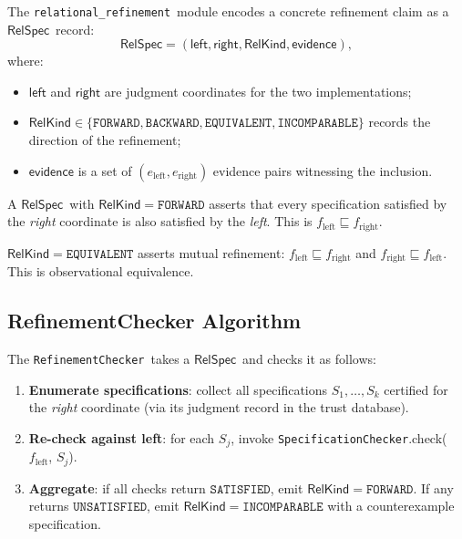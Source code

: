 \documentclass[11pt]{article}
\newcommand{\Refine}{\sqsubseteq}                   %
\newcommand{\RelSpec}{\ensuremath{\mathsf{RelSpec}}} %
\newcommand{\RelKind}{\ensuremath{\mathsf{RelKind}}} %
\newcommand{\SAT}{\texttt{SATISFIED}}               %
\newcommand{\UNSAT}{\texttt{UNSATISFIED}}           %
\newcommand{\relpkg}{\texttt{relational\_refinement}}
\newcommand{\SpecificationChecker}{\texttt{SpecificationChecker}}
\newcommand{\RefinementChecker}{\texttt{RefinementChecker}}
\begin{document}
The \relpkg\ module encodes a concrete refinement claim as a
\RelSpec\ record:
\[
  \RelSpec = (\mathsf{left}, \mathsf{right}, \RelKind, \mathsf{evidence}),
\]
where:
\begin{itemize}[leftmargin=2em]
  \item $\mathsf{left}$ and $\mathsf{right}$ are judgment coordinates
        for the two implementations;
  \item $\RelKind \in \{\texttt{FORWARD}, \texttt{BACKWARD},
        \texttt{EQUIVALENT}, \texttt{INCOMPARABLE}\}$ records the
        direction of the refinement;
  \item $\mathsf{evidence}$ is a set of $(e_{\mathrm{left}},
        e_{\mathrm{right}})$ evidence pairs witnessing the inclusion.
\end{itemize}

\begin{definition}\label{def:forward-refine}
A \RelSpec\ with $\RelKind = \texttt{FORWARD}$ asserts that every
specification satisfied by the \emph{right} coordinate is also
satisfied by the \emph{left}.  This is $f_{\mathrm{left}} \Refine
f_{\mathrm{right}}$.
\end{definition}

\begin{definition}[EQUIVALENT]\label{def:equiv-refine}
$\RelKind = \texttt{EQUIVALENT}$ asserts mutual refinement:
$f_{\mathrm{left}} \Refine f_{\mathrm{right}}$ and
$f_{\mathrm{right}} \Refine f_{\mathrm{left}}$.
This is observational equivalence.
\end{definition}

\subsection{RefinementChecker Algorithm}\label{sec:ref-checker}

The \RefinementChecker\ takes a \RelSpec\ and checks it as follows:
\begin{enumerate}[leftmargin=2em,label=(\roman*)]
  \item \textbf{Enumerate specifications}: collect all specifications
        $S_1,\ldots,S_k$ certified for the \emph{right} coordinate
        (via its judgment record in the trust database).
  \item \textbf{Re-check against left}: for each $S_j$, invoke
        \SpecificationChecker.check($f_{\mathrm{left}}$, $S_j$).
  \item \textbf{Aggregate}: if all checks return $\SAT$,
        emit $\RelKind = \texttt{FORWARD}$.
        If any returns $\UNSAT$, emit $\RelKind = \texttt{INCOMPARABLE}$
        with a counterexample specification.
\end{enumerate}
\end{document}
